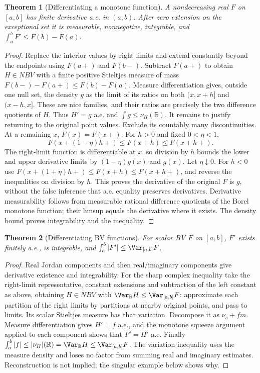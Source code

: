 \documentclass[11pt,oneside,openany]{book}
\newtheorem{theorem}{Theorem}[chapter]
\theoremstyle{definition}
\theoremstyle{remark}
\newcommand{\R}{\mathbb R}\newcommand{\C}{\mathbb C}
\newcommand{\family}[1]{}
\begin{document}
\begin{theorem}[Differentiating a monotone function]\family{D11.12.monotone_differentiation}\label{d11:12:monotone-differentiation}
A nondecreasing real $F$ on $[a,b]$ has finite derivative a.e. in $(a,b)$.
After zero extension on the exceptional set it is measurable,
nonnegative, integrable, and $\int_a^bF'\leq F(b)-F(a)$.
\end{theorem}
\begin{proof}
Replace the interior values by right limits and extend constantly beyond
the endpoints using $F(a+)$ and $F(b-)$. Subtract $F(a+)$ to obtain
$H\in NBV$ with a finite positive Stieltjes measure of mass
$F(b-)-F(a+)\leq F(b)-F(a)$.
Measure differentiation gives, outside one null set, the density $g$ as
the limit of its ratios on both $(x,x+h]$ and $(x-h,x]$.
These are nice families, and their ratios are precisely the two
difference quotients of $H$. Thus $H'=g$ a.e. and
$\int g\leq\nu_H(\R)$.
It remains to justify returning to the original point values. Exclude its
countably many discontinuities. At a remaining $x$, $F(x)=F(x+)$.
For $h>0$ and fixed $0<\eta<1$,
\[
 F(x+(1-\eta)h+)\leq F(x+h)\leq F(x+h+).
\]
The right-limit function is differentiable at $x$, so division by $h$
bounds the lower and upper derivative limits by $(1-\eta)g(x)$ and
$g(x)$. Let $\eta\downarrow0$. For $h<0$ use
$F(x+(1+\eta)h+)\leq F(x+h)\leq F(x+h+)$, and reverse the inequalities
on division by $h$. This proves the derivative of the original $F$ is
$g$, without the false inference that a.e. equality preserves derivatives.
Derivative measurability follows from measurable rational difference
quotients of the Borel monotone function; their limsup equals the derivative
where it exists. The density bound proves integrability and the inequality.
\end{proof}

\begin{theorem}[Differentiating BV functions]\family{D11.12.bv_derivative}\label{d11:12:bv-derivative}
For scalar BV $F$ on $[a,b]$, $F'$ exists finitely a.e., is integrable,
and $\int_a^b|F'|\leq\Var_{[a,b]}F$.
\end{theorem}
\begin{proof}
Real Jordan components and then real/imaginary components give derivative
existence and integrability. For the sharp complex inequality take the
right-limit representative, constant extensions and subtraction of the
left constant as above, obtaining $H\in NBV$ with
$\Var_\R H\leq\Var_{[a,b]}F$: approximate each partition of the right
limits by partitions at nearby original points, and pass to limits.
Its scalar Stieltjes measure has that variation. Decompose it as
$\nu_s+fm$. Measure differentiation gives $H'=f$ a.e., and the
monotone squeeze argument applied to each component shows that $F'=H'$
a.e. Finally
$\int_a^b|f|\leq|\nu_H|(\R)=\Var_\R H\leq\Var_{[a,b]}F$.
The variation inequality uses the measure density and loses no factor
from summing real and imaginary estimates. Reconstruction is not implied;
the singular example below shows why.
\end{proof}
\end{document}
